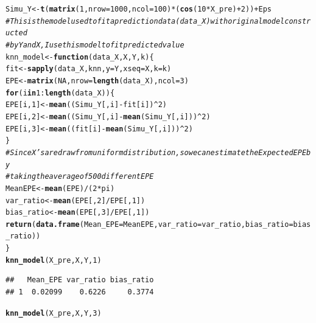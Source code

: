 \documentclass{article}\usepackage[]{graphicx}\usepackage[]{color}
\makeatletter
\newcommand{\hlnum}[1]{\textcolor[rgb]{0.686,0.059,0.569}{#1}}%
\newcommand{\hlcom}[1]{\textcolor[rgb]{0.678,0.584,0.686}{\textit{#1}}}%
\newcommand{\hlopt}[1]{\textcolor[rgb]{0,0,0}{#1}}%
\newcommand{\hlstd}[1]{\textcolor[rgb]{0.345,0.345,0.345}{#1}}%
\newcommand{\hlkwa}[1]{\textcolor[rgb]{0.161,0.373,0.58}{\textbf{#1}}}%
\newcommand{\hlkwb}[1]{\textcolor[rgb]{0.69,0.353,0.396}{#1}}%
\newcommand{\hlkwc}[1]{\textcolor[rgb]{0.333,0.667,0.333}{#1}}%
\newcommand{\hlkwd}[1]{\textcolor[rgb]{0.737,0.353,0.396}{\textbf{#1}}}%
\newenvironment{kframe}{%
 \def\at@end@of@kframe{}%
 \ifinner\ifhmode%
  \def\at@end@of@kframe{\end{minipage}}%
  \begin{minipage}{\columnwidth}%
 \fi\fi%
 \def\FrameCommand##1{\hskip\@totalleftmargin \hskip-\fboxsep
 \colorbox{shadecolor}{##1}\hskip-\fboxsep
     \hskip-\linewidth \hskip-\@totalleftmargin \hskip\columnwidth}%
 \MakeFramed {\advance\hsize-\width
   \@totalleftmargin\z@ \linewidth\hsize
   \@setminipage}}%
 {\par\unskip\endMakeFramed%
 \at@end@of@kframe}
\newenvironment{knitrout}{}{} %
\makeatother
\begin{document}
\begin{knitrout}
\begin{kframe}
\begin{alltt}
\hlstd{Simu_Y} \hlkwb{<-} \hlkwd{t}\hlstd{(}\hlkwd{matrix}\hlstd{(}\hlnum{1}\hlstd{,} \hlkwc{nrow} \hlstd{=} \hlnum{1000}\hlstd{,} \hlkwc{ncol} \hlstd{=} \hlnum{100}\hlstd{)} \hlopt{*} \hlstd{(}\hlkwd{cos}\hlstd{(}\hlnum{10} \hlopt{*} \hlstd{X_pre)} \hlopt{+} \hlnum{2}\hlstd{))} \hlopt{+} \hlstd{Eps}
\hlcom{# This is the model used to fit a prediction data(data_X) with original model constructed}
\hlcom{# by Y and X, I use this model to fit predicted value}
\hlstd{knn_model} \hlkwb{<-} \hlkwa{function}\hlstd{(}\hlkwc{data_X}\hlstd{,} \hlkwc{X}\hlstd{,} \hlkwc{Y}\hlstd{,} \hlkwc{k}\hlstd{) \{}
    \hlstd{fit} \hlkwb{<-} \hlkwd{sapply}\hlstd{(data_X, knn,} \hlkwc{y} \hlstd{= Y,} \hlkwc{xseq} \hlstd{= X,} \hlkwc{k} \hlstd{= k)}
    \hlstd{EPE} \hlkwb{<-} \hlkwd{matrix}\hlstd{(}\hlnum{NA}\hlstd{,} \hlkwc{nrow} \hlstd{=} \hlkwd{length}\hlstd{(data_X),} \hlkwc{ncol} \hlstd{=} \hlnum{3}\hlstd{)}
    \hlkwa{for} \hlstd{(i} \hlkwa{in} \hlnum{1}\hlopt{:}\hlkwd{length}\hlstd{(data_X)) \{}
        \hlstd{EPE[i,} \hlnum{1}\hlstd{]} \hlkwb{<-} \hlkwd{mean}\hlstd{((Simu_Y[, i]} \hlopt{-} \hlstd{fit[i])}\hlopt{^}\hlnum{2}\hlstd{)}
        \hlstd{EPE[i,} \hlnum{2}\hlstd{]} \hlkwb{<-} \hlkwd{mean}\hlstd{((Simu_Y[, i]} \hlopt{-} \hlkwd{mean}\hlstd{(Simu_Y[, i]))}\hlopt{^}\hlnum{2}\hlstd{)}
        \hlstd{EPE[i,} \hlnum{3}\hlstd{]} \hlkwb{<-} \hlkwd{mean}\hlstd{((fit[i]} \hlopt{-} \hlkwd{mean}\hlstd{(Simu_Y[, i]))}\hlopt{^}\hlnum{2}\hlstd{)}
    \hlstd{\}}
    \hlcom{# Since X's are draw from uniform distribution, so we can estimate the Expected EPE by}
    \hlcom{# taking the average of 500 different EPE}
    \hlstd{MeanEPE} \hlkwb{<-} \hlkwd{mean}\hlstd{(EPE)}\hlopt{/}\hlstd{(}\hlnum{2} \hlopt{*} \hlstd{pi)}
    \hlstd{var_ratio} \hlkwb{<-} \hlkwd{mean}\hlstd{(EPE[,} \hlnum{2}\hlstd{]}\hlopt{/}\hlstd{EPE[,} \hlnum{1}\hlstd{])}
    \hlstd{bias_ratio} \hlkwb{<-} \hlkwd{mean}\hlstd{(EPE[,} \hlnum{3}\hlstd{]}\hlopt{/}\hlstd{EPE[,} \hlnum{1}\hlstd{])}
    \hlkwd{return}\hlstd{(}\hlkwd{data.frame}\hlstd{(}\hlkwc{Mean_EPE} \hlstd{= MeanEPE,} \hlkwc{var_ratio} \hlstd{= var_ratio,} \hlkwc{bias_ratio} \hlstd{= bias_ratio))}
\hlstd{\}}
\hlkwd{knn_model}\hlstd{(X_pre, X, Y,} \hlnum{1}\hlstd{)}
\end{alltt}
\begin{verbatim}
##   Mean_EPE var_ratio bias_ratio
## 1  0.02099    0.6226     0.3774
\end{verbatim}
\begin{alltt}
\hlkwd{knn_model}\hlstd{(X_pre, X, Y,} \hlnum{3}\hlstd{)}
\end{alltt}

\end{kframe}
\end{knitrout}
\end{document}
